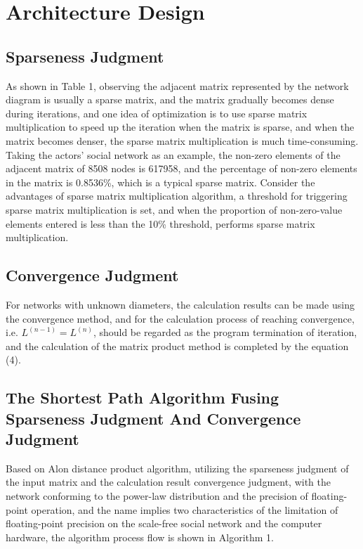 \documentclass[review]{cvpr}
\begin{document}
\section{Architecture Design}

\subsection{Sparseness Judgment}

As shown in Table 1, observing the adjacent matrix represented by the network diagram is usually a sparse matrix, and the matrix gradually becomes dense during iterations,
and one idea of optimization is to use sparse matrix multiplication to speed up the iteration when the matrix is sparse, and when the matrix becomes denser, the sparse matrix multiplication is much time-consuming.
Taking the actors' social network as an example, the non-zero elements of the adjacent matrix of 8508 nodes is 617958, and the percentage of non-zero elements in the matrix is 0.8536\%, which is a typical sparse matrix.
Consider the advantages of sparse matrix multiplication algorithm, a threshold for triggering sparse matrix multiplication is set,
and when the proportion of non-zero-value elements entered is less than the 10\% threshold, performs sparse matrix multiplication.

\subsection{Convergence Judgment}

For networks with unknown diameters, the calculation results can be made using the convergence method, and for the calculation process of reaching convergence,
i.e. $L^{(n-1)}=L^{(n)}$, should be regarded as the program termination of iteration, and the calculation of the matrix product method is completed by the equation (4).

\subsection{The Shortest Path Algorithm Fusing Sparseness Judgment And Convergence Judgment}

Based on Alon \etal distance product algorithm, utilizing the sparseness judgment of the input matrix and the calculation result convergence judgment,
with the network conforming to the power-law distribution and the precision of floating-point operation, and the name implies two characteristics of the limitation
of floating-point precision on the scale-free social network and the computer hardware, the algorithm process flow is shown in Algorithm 1.
\end{document}
